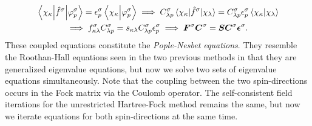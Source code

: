             \begin{gather}
                \mel{\chi_{\kappa}}{\hat{f}^{\sigma}}{\varphi^{\sigma}_{p}}
                = \epsilon^{\sigma}_{p}
                \braket{\chi_{\kappa}}{\varphi^{\sigma}_{p}}
                \implies
                C^{\sigma}_{\lambda p}
                \mel{\chi_{\kappa}}{\hat{f}^{\sigma}}{\chi_{\lambda}}
                = C^{\sigma}_{\lambda p} \epsilon^{\sigma}_{p}
                \braket{\chi_{\kappa}}{\chi_{\lambda}}
                \\
                \implies
                f^{\sigma}_{\kappa \lambda}
                C^{\sigma}_{\lambda p}
                =
                s_{\kappa\lambda}
                C^{\sigma}_{\lambda p}
                \epsilon^{\sigma}_{p}
                \implies
                \boldsymbol{F}^{\sigma}
                \boldsymbol{C}^{\sigma}
                =
                \boldsymbol{S}
                \boldsymbol{C}^{\sigma}
                \boldsymbol{\epsilon}^{\sigma}.
                \label{eq:pople-nesbet}
            \end{gather}
            These coupled equations constitute the \emph{Pople-Nesbet
            equations}.
            They resemble the Roothan-Hall equations seen in the two previous
            methods in that they are generalized eigenvalue equations, but now
            we solve two sets of eigenvalue equations simultaneously.
            Note that the coupling between the two spin-directions occurs in the
            Fock matrix via the Coulomb operator.
            The self-consistent field iterations for the unrestricted
            Hartree-Fock method remains the same, but now we iterate equations
            for both spin-directions at the same time.

